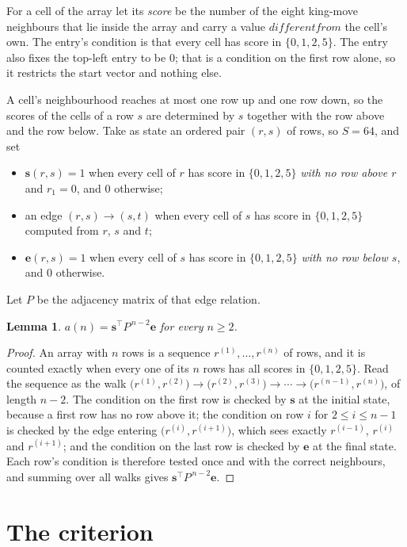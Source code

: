 \documentclass[11pt,a4paper]{article}
\theoremstyle{plain}
\newtheorem{lemma}[theorem]{Lemma}
\theoremstyle{definition}
\begin{document}
For a cell of the array let its \emph{score} be the number of the eight king-move neighbours that lie inside
the array and carry a value $different from$ the cell's own. The entry's condition is that every cell
has score in $\{0,1,2,5\}$. The entry also fixes the top-left entry to be $0$; that is a condition on the first row alone, so it restricts the start vector and nothing else.

A cell's neighbourhood reaches at most one row up and one row down, so the scores of the
cells of a row $s$ are determined by $s$ together with the row above and the row below.
Take as state an ordered pair $(r,s)$ of rows, so $S=64$, and set
\begin{itemize}
\item $\mathbf{s}(r,s)=1$ when every cell of $r$ has score in $\{0,1,2,5\}$ \emph{with no row
above $r$} and $r_1=0$, and $0$ otherwise;
\item an edge $(r,s)\to(s,t)$ when every cell of $s$ has score in $\{0,1,2,5\}$ computed from
$r$, $s$ and $t$;
\item $\mathbf{e}(r,s)=1$ when every cell of $s$ has score in $\{0,1,2,5\}$ \emph{with no row
below $s$}, and $0$ otherwise.
\end{itemize}
Let $P$ be the adjacency matrix of that edge relation.

\begin{lemma}\label{lem:walk}
$a(n)=\mathbf{s}^{\!\top}P^{\,n-2}\mathbf{e}$ for every $n\ge2$.
\end{lemma}

\begin{proof}
An array with $n$ rows is a sequence $r^{(1)},\dots,r^{(n)}$ of rows, and it is counted
exactly when every one of its $n$ rows has all scores in $\{0,1,2,5\}$. Read the sequence as the
walk $\bigl(r^{(1)},r^{(2)}\bigr)\to\bigl(r^{(2)},r^{(3)}\bigr)\to\cdots\to
\bigl(r^{(n-1)},r^{(n)}\bigr)$, of length $n-2$. The condition on the first row is
checked by $\mathbf{s}$ at the initial state, because a first row has no row above it; the
condition on row $i$ for $2\le i\le n-1$ is checked by the edge entering
$\bigl(r^{(i)},r^{(i+1)}\bigr)$, which sees exactly $r^{(i-1)}$, $r^{(i)}$ and
$r^{(i+1)}$; and the condition on the last row is checked by $\mathbf{e}$ at the final
state. Each row's condition is therefore tested once and with the correct neighbours, and
summing over all walks gives $\mathbf{s}^{\!\top}P^{\,n-2}\mathbf{e}$.
\end{proof}

\section{The criterion}
\end{document}
